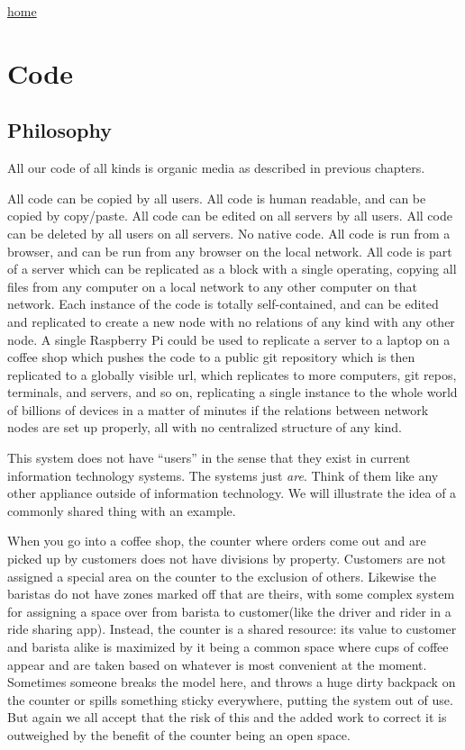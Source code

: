 \href{index.html}{home}

\section{Code}\label{code}

\subsection{Philosophy}

All our code of all kinds is organic media as described in previous chapters.

All code can be copied by all users. All code is human readable, and can be copied by copy/paste.  All code can be edited on all servers by all users.  All code can be deleted by all users on all servers.  No native code.  All code is run from a browser, and can be run from any browser on the local network.  All code is part of a server which can be replicated as a block with a single operating, copying all files from any computer on a local network to any other computer on that network.  Each instance of the code is totally self-contained, and can be edited and replicated to create a new node with no relations of any kind with any other node.  A single Raspberry Pi could be used to replicate a server to a laptop on a coffee shop which pushes the code to a public git repository which is then replicated to a globally visible url, which replicates to more computers, git repos, terminals, and servers, and so on, replicating a single instance to the whole world of billions of devices in a matter of minutes if the relations between network nodes are set up properly, all with no centralized structure of any kind.  

This system does not have ``users'' in the sense that they exist in current information technology systems.  The systems just \emph{are}.  Think of them like any other appliance outside of information technology.  We will illustrate the idea of a commonly shared thing with an example.

When you go into a coffee shop, the counter where orders come out and are picked up by customers does not have divisions by property.  Customers are not assigned a special area on the counter to the exclusion of others.  Likewise the baristas do not have zones marked off that are theirs, with some complex system for assigning a space over from barista to customer(like the driver and rider in a ride sharing app).  Instead, the counter is a shared resource: its value to customer and barista alike is maximized by it being a common space where cups of coffee appear and are taken based on whatever is most convenient at the moment.  Sometimes someone breaks the model here, and throws a huge dirty backpack on the counter or spills something sticky everywhere, putting the system out of use.  But again we all accept that the risk of this and the added work to correct it is outweighed by the benefit of the counter being an open space.  


